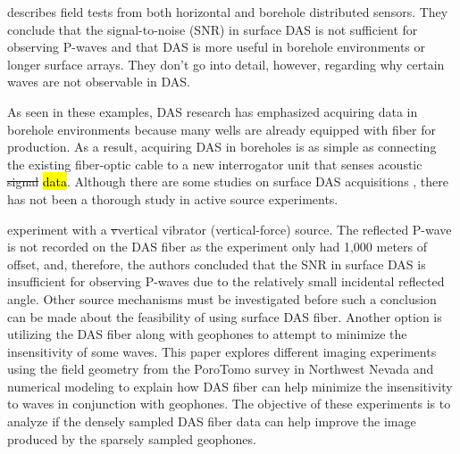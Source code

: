 
\citet{daley2013field} describes field tests from both horizontal and borehole distributed sensors. They conclude that the signal-to-noise (SNR) in surface DAS is not sufficient for observing P-waves and that DAS is more useful in borehole environments or longer surface arrays. They don't go into detail, however, regarding why certain waves are not observable in DAS.

As seen in these examples, DAS research has emphasized acquiring data in borehole environments because many wells are already equipped with fiber for production. As a result, acquiring DAS in boreholes is as simple as connecting the existing fiber-optic cable to a new interrogator unit that senses acoustic \sout{signal} \hl{data}. Although there are some studies on surface DAS acquisitions \citep{daley2013field, hornman2017field}, there has not been a thorough study in active source experiments.


\citet{daley2013field} experiment with a \sout{v}vertical vibrator (vertical-force) source. The reflected P-wave is not recorded on the DAS fiber as the experiment only had 1,000 meters of offset, and, therefore, the authors concluded that the SNR in surface DAS is insufficient for observing P-waves due to the relatively small incidental reflected angle. Other source mechanisms must be investigated before such a conclusion can be made about the feasibility of using surface DAS fiber. Another option is utilizing the DAS fiber along with geophones to attempt to minimize the insensitivity of some waves. This paper explores different imaging experiments using the field geometry from the PoroTomo survey in Northwest Nevada and numerical modeling to explain how DAS fiber can help minimize the insensitivity to waves in conjunction with geophones. The objective of these experiments is to analyze if the densely sampled DAS fiber data can help improve the image produced by the sparsely sampled geophones.

